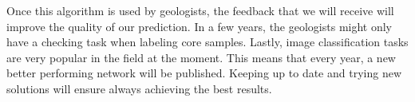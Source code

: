 Once this algorithm is used by geologists, the feedback that we will receive will improve the quality of our prediction. In a few years, the geologists might only have a checking task when labeling core samples. Lastly, image classification tasks are very popular in the field at the moment. This means that every year, a new better performing network will be published. Keeping up to date and trying new solutions will ensure always achieving the best results. 
